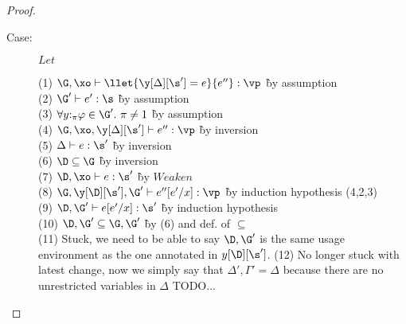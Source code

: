 \begin{proof}
\begin{description}
\item[Case:] $Let$
\begin{tabbing}
  (1) $\G, \xo \vdash \llet{\y[\Delta][\s'] = e}{e''} : \vp$ \` by assumption\\
  (2) $\G' \vdash e' : \s$ \` by assumption \\
  (3) $\hasnolinearvars{\G'}$ \` by assumption\\
  (4) $\G,\xo,\y[\Delta][\s'] \vdash e'' : \vp$ \` by inversion\\
  (5) $\Delta \vdash e : \s'$ \` by inversion\\
  (6) $\D \subseteq \G$ \` by inversion\\
  (7) $\D,\xo \vdash e : \s'$ \` by $Weaken$\\
  (8) $\G, \y[\D][\s'], \G' \vdash e''[e'/x] : \vp$ \` by induction hypothesis (4,2,3)\\
  (9) $\D, \G' \vdash e[e'/x] : \s'$ \` by induction hypothesis\\
  (10) $\D,\G' \subseteq \G,\G'$ \` by (6) and def. of $\subseteq$\\
  (11) Stuck, we need to be able to say $\D,\G'$ is the same usage environment as the one annotated in $y[\D][\s']$.
  (12) No longer stuck with latest change, now we simply say that $\Delta',\Gamma' = \Delta$ because there are no unrestricted variables in $\Delta$
  TODO...
\end{tabbing}

\end{description}

\end{proof}

